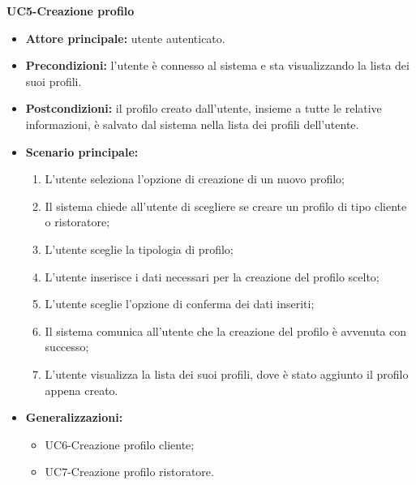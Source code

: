 \textbf{UC5-Creazione profilo}
\begin{itemize}
    \item \textbf{Attore principale:} utente autenticato.
    \item \textbf{Precondizioni:} l'utente è connesso al sistema e sta visualizzando la lista dei suoi profili.
    \item \textbf{Postcondizioni:} il profilo creato dall'utente, insieme a tutte le relative informazioni,
    è salvato dal sistema nella lista dei profili dell'utente.
    \item \textbf{Scenario principale:}
    \begin{enumerate}
        \item L'utente seleziona l'opzione di creazione di un nuovo profilo;
        \item Il sistema chiede all'utente di scegliere se creare un profilo di tipo cliente
        o ristoratore;
        \item L'utente sceglie la tipologia di profilo;
        \item L'utente inserisce i dati necessari per la creazione del profilo scelto;
        \item L'utente sceglie l'opzione di conferma dei dati inseriti;
        \item Il sistema comunica all'utente che la creazione del profilo è avvenuta con successo;
        \item L'utente visualizza la lista dei suoi profili, dove è stato aggiunto il profilo appena creato.
    \end{enumerate}
    \item \textbf{Generalizzazioni:}
        \begin{itemize}
            \item UC6-Creazione profilo cliente;
            \item UC7-Creazione profilo ristoratore.
        \end{itemize}
\end{itemize}

